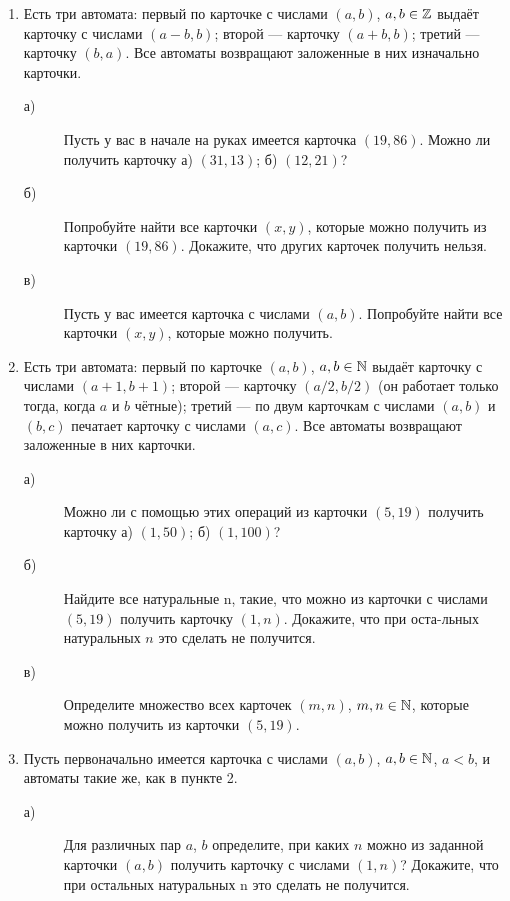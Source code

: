 \begin{enumerate}
\item Есть три автомата: первый по карточке с числами $(a, b)$, $a, b \in \mathbb{Z}$ выдаёт карточку с числами $(a - b, b)$; второй — карточку $(a + b, b)$; третий — карточку $(b, a)$. Все автоматы возвращают заложенные в них изначально карточки.
    \begin{description}
    \item [а) ]Пусть у вас в начале на руках имеется карточка $(19, 86)$. Можно ли получить карточку а) $(31,13)$; б) $(12, 21)$?
    \item [б) ]Попробуйте найти все карточки $(x, y)$, которые можно получить из карточки $(19, 86)$. Докажите, что других карточек получить нельзя.
    \item [в) ]Пусть у вас имеется карточка с числами $(a, b)$. Попробуйте найти все карточки $(x, y)$, которые можно получить.
    \end{description}
 \item Есть три автомата: первый по карточке $(a, b)$, $a, b \in \mathbb{N}$ выдаёт карточку с числами $(a + 1, b + 1)$; второй — карточку $(a/2,b/2)$ (он работает только тогда, когда $a$ и $b$ чётные); третий — по двум карточкам с числами $(a, b)$ и $(b, c)$ печатает карточку с числами $(a, c)$. Все автоматы возвращают заложенные в них карточки.
     \begin{description}
    \item [а) ]Можно ли с помощью этих операций из карточки $(5, 19)$ получить карточку а) $(1,50)$; б) $(1, 100)$?
    \item [б) ]Найдите все натуральные n, такие, что можно из карточки с числами $(5, 19)$ получить карточку $(1, n)$. Докажите, что при оста-\linebreak льных натуральных $n$ это сделать не получится.
    \item [в) ]Определите множество всех карточек $(m, n)$, $m, n \in \mathbb{N}$, которые можно получить из карточки $(5, 19)$.
    \end{description}
 \item Пусть первоначально имеется карточка с числами $(a, b)$, $a, b \in \mathbb{N}$, $a < b$, и автоматы такие же, как в пункте 2.
 \begin{description}
    \item [а) ]Для различных пар $a$, $b$ определите, при каких $n$ можно из заданной карточки $(a, b)$ получить карточку с числами $(1, n)$? Докажите, что при остальных натуральных n это сделать не получится.

\end{description}
\end{enumerate}

